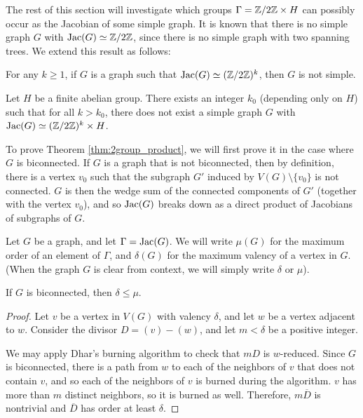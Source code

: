\documentclass{amsart}
\begin{document}
The rest of this section will investigate which groups $\Gamma =
\mathbb{Z}/2\mathbb{Z} \times H$ can possibly occur as the Jacobian of some simple
graph. It is known that there is no simple graph $G$ with $\operatorname{Jac}(G)
\simeq \mathbb{Z}/2\mathbb{Z}$, since there is no simple graph with two spanning trees. We extend this result as
follows:

\begin{thm}
  \label{thm:2group}
  For any $k \ge 1$, if $G$ is a graph such that $\operatorname{Jac}(G) \simeq
  (\mathbb{Z}/2\mathbb{Z})^k$, then $G$ is not simple.
\end{thm}

\begin{thm}
  \label{thm:2group_product}
  Let $H$ be a finite abelian group. There exists an integer $k_0$
  (depending only on $H$) such that for all $k > k_0$, there does not exist
  a simple graph $G$ with $\operatorname{Jac}(G) \simeq (\mathbb{Z}/2\mathbb{Z})^k \times H$.
\end{thm}

To prove Theorem \ref{thm:2group_product}, we will first prove it in the case
where $G$ is biconnected. If $G$ is a
graph that is not biconnected, then by definition, there is a vertex
$v_0$ such that the subgraph $G'$ induced by $V(G) \setminus \{v_0\}$
is not connected. $G$ is then the wedge sum of the connected components of
$G'$ (together with the vertex $v_0$), and so $\operatorname{Jac}(G)$ breaks down as
a direct product of Jacobians of subgraphs of $G$.

\begin{defn}
  Let $G$ be a graph, and let $\Gamma = \operatorname{Jac}(G)$. We will write $\mu(G)$
  for the maximum order of an element of $\Gamma$, and $\delta(G)$ for
  the maximum valency of a vertex in $G$. (When the graph $G$ is clear
  from context, we will simply write $\delta$ or $\mu$). 
\end{defn}

\begin{lem}
  \label{lem:delta_le_mu}
  If $G$ is biconnected, then $\delta \le \mu$.
\end{lem}
\begin{proof}
  Let $v$ be a vertex in $V(G)$ with valency $\delta$, and let $w$ be
  a vertex adjacent to $w$. Consider the divisor $D = (v) -
  (w)$, and let $m < \delta$ be a positive integer. 

  We may apply Dhar's burning algorithm to check that $mD$ is
  $w$-reduced. Since $G$ is biconnected, there is a path from $w$ to
  each of the neighbors of $v$ that does not contain $v$, and so each
  of the neighbors of $v$ is burned during the algorithm. $v$ has more
  than $m$ distinct neighbors, so it is burned as well. Therefore,
  $m\overline{D}$ is nontrivial and $\overline{D}$ has order at least
  $\delta$.
\end{proof}
\end{document}
